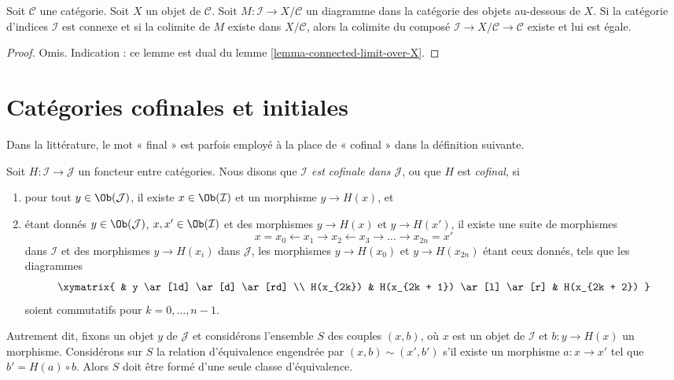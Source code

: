 \begin{lemma}
\label{lemma-connected-colimit-under-X}
Soit $\mathcal{C}$ une catégorie.
Soit $X$ un objet de $\mathcal{C}$.
Soit $M : \mathcal{I} \to X/\mathcal{C}$ un diagramme
dans la catégorie des objets au-dessous de $X$.
Si la catégorie d'indices $\mathcal{I}$ est connexe
et si la colimite de $M$ existe dans $X/\mathcal{C}$,
alors la colimite du composé
$\mathcal{I} \to X/\mathcal{C} \to \mathcal{C}$
existe et lui est égale.
\end{lemma}

\begin{proof}
Omis. Indication : ce lemme est dual du
lemme \ref{lemma-connected-limit-over-X}.
\end{proof}




\section{Catégories cofinales et initiales}
\label{section-cofinal}

\noindent
Dans la littérature, le mot « final » est parfois employé à la place de
« cofinal » dans la définition suivante.

\begin{definition}
\label{definition-cofinal}
Soit $H : \mathcal{I} \to \mathcal{J}$ un foncteur entre catégories.
Nous disons que {\it $\mathcal{I}$ est cofinale dans $\mathcal{J}$},
ou que $H$ est {\it cofinal}, si
\begin{enumerate}
\item pour tout $y \in \Ob(\mathcal{J})$, il existe
$x \in \Ob(\mathcal{I})$ et un morphisme $y \to H(x)$, et
\item étant donnés $y \in \Ob(\mathcal{J})$,
$x, x' \in \Ob(\mathcal{I})$ et des morphismes
$y \to H(x)$ et $y \to H(x')$, il existe une suite de morphismes
$$
x = x_0 \leftarrow x_1 \rightarrow x_2 \leftarrow x_3 \rightarrow \ldots
\rightarrow x_{2n} = x'
$$
dans $\mathcal{I}$ et des morphismes $y \to H(x_i)$ dans $\mathcal{J}$,
les morphismes $y \to H(x_0)$ et $y \to H(x_{2n})$ étant ceux donnés,
tels que les diagrammes
$$
\xymatrix{
& y \ar[ld] \ar[d] \ar[rd] \\
H(x_{2k}) & H(x_{2k + 1}) \ar[l] \ar[r] & H(x_{2k + 2})
}
$$
soient commutatifs pour $k = 0, \ldots, n - 1$.
\end{enumerate}
Autrement dit, fixons un objet $y$ de $\mathcal{J}$ et considérons
l'ensemble $S$ des couples $(x, b)$, où $x$ est un objet de $\mathcal{I}$
et $b : y \to H(x)$ un morphisme. Considérons sur $S$ la relation
d'équivalence engendrée par $(x, b) \sim (x', b')$ s'il existe un
morphisme $a : x \to x'$ tel que $b' = H(a) \circ b$. Alors $S$ doit
être formé d'une seule classe d'équivalence.
\end{definition}

